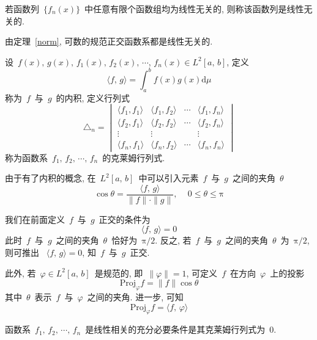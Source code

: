 \begin{Definition}
若函数列~$\{f_n(x)\}$~中任意有限个函数组均为线性无关的, 则称该函数列是线性无关的.
\end{Definition}

由定理~\ref{norm}, 可数的规范正交函数系都是线性无关的.

\begin{Definition}
设~$f(x), \, g(x),\, f_{1}(x),\, f_{2}(x),\, \cdots, \, f_{n}(x)\in L^2[a,\,b]$, 定义
\[
\langle f,\,g\rangle=\int_{a}^{b}f(x)g(x)\mathrm{d}\mu
\]
称为~$f$~与~$g$~的内积, 定义行列式
\[
\triangle_{n}=\begin{vmatrix}
\langle f_{1},f_{1}\rangle & \langle f_{1},f_{2}\rangle & \cdots & \langle f_{1},f_{n}\rangle\\[0.1cm]
\langle f_{2},f_{1}\rangle & \langle f_{2},f_{2}\rangle & \cdots & \langle f_{2},f_{n}\rangle\\[0.1cm]
\vdots & \vdots & & \vdots\\[0.1cm]
\langle f_{n},f_{1}\rangle & \langle f_{n},f_{2}\rangle & \cdots & \langle f_{n},f_{n}\rangle
\end{vmatrix}
\]
称为函数系~$f_{1},\, f_{2},\, \cdots,\,  f_{n}$~的克莱姆行列式.
\end{Definition}

由于有了内积的概念, 在~$L^2[a,\,b]$~中可以引入元素~$f$~与~$g$~之间的夹角~$\theta$
\[
\cos \theta=\frac{\langle f,\,g\rangle}{\|f\|\cdot\|g\|}, \,\quad 0\leqslant \theta \leqslant \mathrm{\pi}
\]

我们在前面定义~$f$~与~$g$~正交的条件为
\[
\langle f,\,g\rangle=0
\]
此时~$f$~与~$g$~之间的夹角~$\theta$~恰好为~$\mathrm{\pi}/2$. 反之, 若~$f$~与~$g$~之间的夹角~$\theta$~为~$\mathrm{\pi}/2$, 则可推出~
$\langle f,\,g\rangle=0$, 知~$f$~与~$g$~正交.

此外, 若~$\varphi\in L^2[a,\,b]$~是规范的, 即~$\|\varphi\|=1$, 可定义~$f$~在方向~$\varphi$~上的投影
\[
\mathrm{Proj}_{\varphi}f=\|f\|\cos \theta
\]
其中~$\theta$~表示~$f$~与~$\varphi$~之间的夹角. 进一步, 可知
\[
\mathrm{Proj}_{\varphi}f=\langle f,\,\varphi\rangle
\]

\begin{Theorem}\label{gram}
函数系~$f_{1},\, f_{2},\, \cdots,\,  f_{n}$~是线性相关的充分必要条件是其克莱姆行列式为~0.
\end{Theorem}


